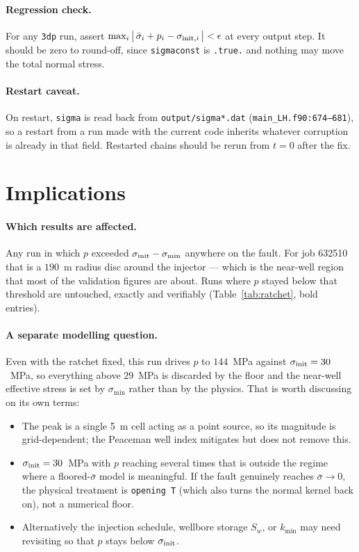 \documentclass[11pt]{article}
\newcommand{\code}[1]{\texttt{#1}}
\newcommand{\sigeff}{\bar{\sigma}}
\begin{document}
\paragraph{Regression check.} For any \code{3dp} run, assert
$\max_i\big|\,\sigeff_i + p_i - \sigma_{{\rm init},i}\,\big| < \epsilon$ at
every output step. It should be zero to round-off, since \code{sigmaconst} is
\code{.true.} and nothing may move the total normal stress.

\paragraph{Restart caveat.} On restart, \code{sigma} is read back from
\code{output/sigma*.dat} (\code{main\_LH.f90:674--681}), so a restart from a
run made with the current code inherits whatever corruption is already in that
field. Restarted chains should be rerun from $t=0$ after the fix.

\section{Implications}

\paragraph{Which results are affected.} Any run in which $p$ exceeded
$\sigma_{\rm init} - \sigma_{\min}$ anywhere on the fault. For job 632510 that
is a $190$~m radius disc around the injector --- which is the near-well region
that most of the validation figures are about. Runs where $p$ stayed below
that threshold are untouched, exactly and verifiably (Table~\ref{tab:ratchet},
bold entries).

\paragraph{A separate modelling question.} Even with the ratchet fixed, this
run drives $p$ to $144$~MPa against $\sigma_{\rm init}=30$~MPa, so everything
above $29$~MPa is discarded by the floor and the near-well effective stress is
set by $\sigma_{\min}$ rather than by the physics. That is worth discussing on
its own terms:
\begin{itemize}
\item The peak is a single 5~m cell acting as a point source, so its
      magnitude is grid-dependent; the Peaceman well index mitigates but does
      not remove this.
\item $\sigma_{\rm init}=30$~MPa with $p$ reaching several times that is
      outside the regime where a floored-$\sigeff$ model is meaningful. If
      the fault genuinely reaches $\sigeff\to0$, the physical treatment is
      \code{opening T} (which also turns the normal kernel back on), not a
      numerical floor.
\item Alternatively the injection schedule, wellbore storage $S_w$, or
      $k_{\min}$ may need revisiting so that $p$ stays below
      $\sigma_{\rm init}$.
\end{itemize}
\end{document}
